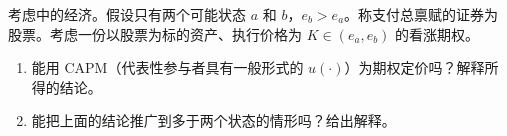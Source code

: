 \par\noindent\begin{minipage}{\linewidth}
\begin{problem}
 考虑中的经济。假设只有两个可能状态 $a$ 和 $b$，$e_{b}>e_{a}$。称支付总禀赋的证券为股票。考虑一份以股票为标的资产、执行价格为 $K\in(e_{a},e_{b})$ 的看涨期权。
\begin{enumerate}[label=(\alph*)]
    \item 能用 CAPM（代表性参与者具有一般形式的 $u(\cdot)$）为期权定价吗？解释所得的结论。
    \item 能把上面的结论推广到多于两个状态的情形吗？给出解释。
\end{enumerate}
\end{problem}
\end{minipage}\par
{}
